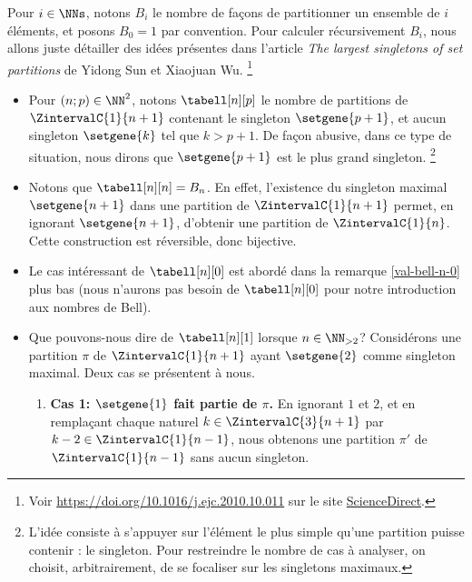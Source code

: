 Pour $i \in \NNs$, notons $B_i$ le nombre de façons de partitionner un ensemble de $i$ éléments, et posons $B_0 = 1$ par convention.
Pour calculer récursivement $B_i$, nous allons juste détailler des idées présentes dans l'article
\emph{\og The largest singletons of set partitions \fg}
de Yidong Sun et Xiaojuan Wu.%
    \footnote{
    	Voir
	\url{https://doi.org/10.1016/j.ejc.2010.10.011}
	sur le site \href{https://www.sciencedirect.com/}{ScienceDirect}.
}
%
\begin{itemize}
    \item Pour $(n ; p) \in \NN^2$, notons $\tabell[n][p]$ le nombre de partitions de $\ZintervalC{1}{n+1}$ contenant le singleton $\setgene{p+1}$, et aucun singleton $\setgene{k}$ tel que $k > p+1$.
    De façon abusive, dans ce type de situation, nous dirons que $\setgene{p+1}$ est le plus grand singleton.%
    \footnote{
        L’idée consiste à s’appuyer sur l’élément le plus simple qu’une partition puisse contenir : le singleton.
        Pour restreindre le nombre de cas à analyser, on choisit, arbitrairement, de se focaliser sur les singletons maximaux.
    }


    \item Notons que $\tabell[n][n] = B_n$.
    En effet,
    l'existence du singleton maximal $\setgene{n+1}$ dans une partition de $\ZintervalC{1}{n+1}$ permet, en ignorant $\setgene{n+1}$, d'obtenir une partition de $\ZintervalC{1}{n}$.
    Cette construction est réversible, donc bijective.


    \item Le cas intéressant de $\tabell[n][0]$ est abordé dans la remarque \ref{val-bell-n-0} plus bas (nous n'aurons pas besoin de $\tabell[n][0]$ pour notre introduction aux nombres de Bell).


    \item Que pouvons-nous dire de $\tabell[n][1]$ lorsque $n \in \NN_{>2}$?
    Considérons une partition $\pi$ de $\ZintervalC{1}{n+1}$ ayant $\setgene{2}$ comme singleton maximal.
    Deux cas se présentent à nous.
    \begin{enumerate}
    	\item \textbf{\boldmath Cas 1: $\setgene{1}$ fait partie de $\pi$.}
        En ignorant $1$ et $2$,
        et
        en remplaçant chaque naturel $k \in \ZintervalC{3}{n+1}$ par $k-2 \in \ZintervalC{1}{n-1}$,
        nous obtenons une partition $\pi'$ de $\ZintervalC{1}{n-1}$ sans aucun singleton.



\end{enumerate}
\end{itemize}
